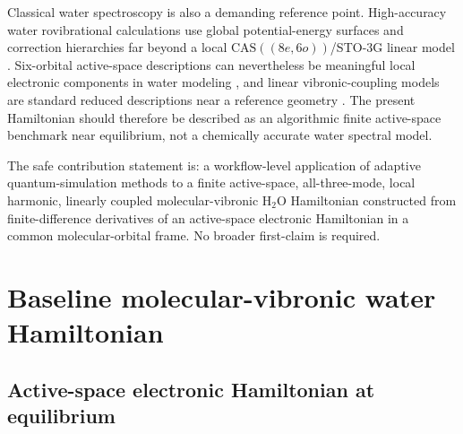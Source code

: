 \documentclass[
  reprint,
  amsmath,
  amssymb,
  aps,
  pra,
  nofootinbib,
  superscriptaddress,
  floatfix
]{revtex4-2}
\newcommand{\CAS}{\mathrm{CAS}}
\newcommand{\HtwoO}{\mathrm{H_2O}}
\begin{document}
Classical water spectroscopy is also a demanding reference point.  High-accuracy water rovibrational calculations use global potential-energy surfaces and correction hierarchies far beyond a local \(\CAS((8e,6o))\)/STO-3G linear model \cite{PartridgeSchwenke1997,Polyansky2013Water}.  Six-orbital active-space descriptions can nevertheless be meaningful local electronic components in water modeling \cite{KedzioraShavitt1997}, and linear vibronic-coupling models are standard reduced descriptions near a reference geometry \cite{Staab2022LVC}.  The present Hamiltonian should therefore be described as an algorithmic finite active-space benchmark near equilibrium, not a chemically accurate water spectral model.

The safe contribution statement is: a workflow-level application of adaptive quantum-simulation methods to a finite active-space, all-three-mode, local harmonic, linearly coupled molecular-vibronic \(\HtwoO\) Hamiltonian constructed from finite-difference derivatives of an active-space electronic Hamiltonian in a common molecular-orbital frame.  No broader first-claim is required.

\section{Baseline molecular-vibronic water Hamiltonian}
\label{sec:h2o_hamiltonian}

\subsection{Active-space electronic Hamiltonian at equilibrium}
\end{document}
